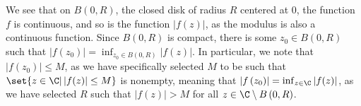 \documentclass[11pt]{mypackage}
\begin{document}
\begin{solution}
\begin{enumerate}[(a)]
      We see that on $B\left( 0,R \right)$, the closed disk of radius $R$ centered at $0$, the function $f$ is continuous, and so is the function $\left\vert f(z) \right\vert$, as the modulus is also a continuous function. Since $B(0,R)$ is compact, there is some $z_0\in B\left( 0,R \right)$ such that $\left\vert f\left(z_0\right) \right\vert = \inf_{z_0\in B\left( 0,R \right)}\left\vert f(z) \right\vert$. In particular, we note that $\left\vert f\left(z_0\right) \right\vert \leq M$, as we have specifically selected $M$ to be such that $\set{z\in \C | \left\vert f(z) \right\vert \leq M}$ is nonempty, meaning that $\left\vert f\left( z_0 \right) \right\vert = \inf_{z\in \C} \left\vert f(z) \right\vert$, as we have selected $R$ such that $ \left\vert f(z) \right\vert > M $ for all $z \in \C\setminus B\left( 0,R \right)$.
  \end{enumerate}
\end{solution}
\end{document}
